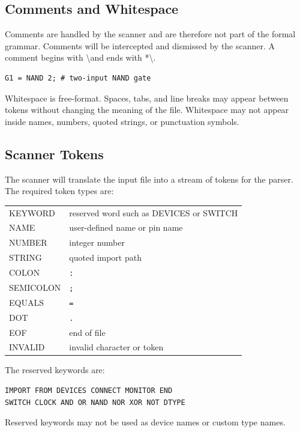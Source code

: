 \documentclass[10pt,a4paper]{article}
\begin{document}
\subsection{Comments and Whitespace}

Comments are handled by the scanner and are therefore not part of the formal
grammar. Comments will be intercepted and dismissed by the scanner. A comment begins with \textbackslash* and ends with *\textbackslash. 

\begin{verbatim}
G1 = NAND 2; # two-input NAND gate
\end{verbatim}

Whitespace is free-format. Spaces, tabs, and line breaks may appear between
tokens without changing the meaning of the file. Whitespace may not appear
inside names, numbers, quoted strings, or punctuation symbols.

\subsection{Scanner Tokens}

The scanner will translate the input file into a stream of tokens for the
parser. The required token types are:

\begin{center}
\begin{tabular}{>{\ttfamily}ll}
KEYWORD & reserved word such as DEVICES or SWITCH\\
NAME & user-defined name or pin name\\
NUMBER & integer number\\
STRING & quoted import path\\
COLON & \texttt{:}\\
SEMICOLON & \texttt{;}\\
EQUALS & \texttt{=}\\
DOT & \texttt{.}\\
EOF & end of file\\
INVALID & invalid character or token\\
\end{tabular}
\end{center}

The reserved keywords are:

\begin{verbatim}
IMPORT FROM DEVICES CONNECT MONITOR END
SWITCH CLOCK AND OR NAND NOR XOR NOT DTYPE
\end{verbatim}

Reserved keywords may not be used as device names or custom type names.
\end{document}
